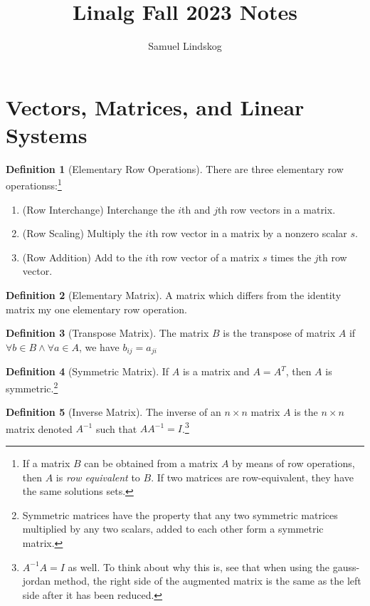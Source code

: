 \documentclass[nobib,notoc]{tufte-handout}
\begin{document}
\theoremstyle{definition}\newtheorem{defi}{Definition}[section]
\theoremstyle{definition}\newtheorem{thm}{Theorem}[section]
\theoremstyle{definition}\newtheorem{cor}{Corollary}[section]
\theoremstyle{definition}\newtheorem{lem}{Lemma}[section]
\theoremstyle{remark}\newtheorem*{notat}{Notation}

\title{Linalg Fall 2023 Notes}
\author{Samuel Lindskog}
\maketitle

\setcounter{section}{1}
\setcounter{tocdepth}{1}

\section{Vectors, Matrices, and Linear Systems}
\begin{defi}[Elementary Row Operations]
	There are three elementary row operationss:\footnote{If a matrix \(B\) can be obtained from a matrix \(A\) by means of row operations, then \(A\) is \emph{row equivalent} to \(B\). If two matrices are row-equivalent, they have the same solutions sets.}
	\begin{enumerate}
		\item (Row Interchange) Interchange the \(i\)th and \(j\)th row vectors in a matrix.
		\item (Row Scaling) Multiply the \(i\)th row vector in a matrix by a nonzero scalar \(s\).
		\item (Row Addition) Add to the \(i\)th row vector of a matrix \(s\) times the \(j\)th row vector.
	\end{enumerate}
\end{defi}
\begin{defi}[Elementary Matrix]
A matrix which differs from the identity matrix my one elementary row operation.
\end{defi}
\begin{defi}[Transpose Matrix]
	The matrix \(B\) is the transpose of matrix \(A\) if \(\forall b\in B\wedge\forall a\in A\), we have \(b_{ij}=a_{ji}\)
\end{defi}
\begin{defi}[Symmetric Matrix]
	If \(A\) is a matrix and \(A=A^T\), then \(A\) is symmetric.\footnote{Symmetric matrices have the property that any two symmetric matrices multiplied by any two scalars, added to each other form a symmetric matrix.}
\end{defi}
\begin{defi}[Inverse Matrix]
	The inverse of an \(n\times n\) matrix \(A\) is the \(n\times n\) matrix denoted \(A^{-1}\) such that \(AA^{-1}=I\).\footnote{\(A^{-1}A=I\) as well. To think about why this is, see that when using the gauss-jordan method, the right side of the augmented matrix is the same as the left side after it has been reduced.}
\end{defi}
\end{document}
